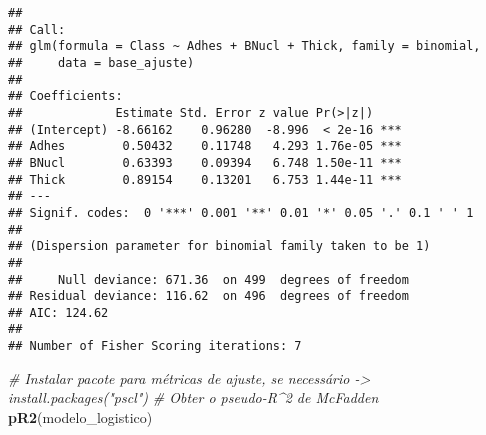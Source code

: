 \documentclass[
]{article}
\newenvironment{Shaded}{\begin{snugshade}}{\end{snugshade}}
\newcommand{\AttributeTok}[1]{\textcolor[rgb]{0.13,0.29,0.53}{#1}}
\newcommand{\CommentTok}[1]{\textcolor[rgb]{0.56,0.35,0.01}{\textit{#1}}}
\newcommand{\DecValTok}[1]{\textcolor[rgb]{0.00,0.00,0.81}{#1}}
\newcommand{\FunctionTok}[1]{\textcolor[rgb]{0.13,0.29,0.53}{\textbf{#1}}}
\newcommand{\NormalTok}[1]{#1}
\newcommand{\OtherTok}[1]{\textcolor[rgb]{0.56,0.35,0.01}{#1}}
\newcommand{\SpecialCharTok}[1]{\textcolor[rgb]{0.81,0.36,0.00}{\textbf{#1}}}
\newcommand{\StringTok}[1]{\textcolor[rgb]{0.31,0.60,0.02}{#1}}
\begin{document}
\begin{Shaded}
\end{Shaded}

\begin{verbatim}
## 
## Call:
## glm(formula = Class ~ Adhes + BNucl + Thick, family = binomial, 
##     data = base_ajuste)
## 
## Coefficients:
##             Estimate Std. Error z value Pr(>|z|)    
## (Intercept) -8.66162    0.96280  -8.996  < 2e-16 ***
## Adhes        0.50432    0.11748   4.293 1.76e-05 ***
## BNucl        0.63393    0.09394   6.748 1.50e-11 ***
## Thick        0.89154    0.13201   6.753 1.44e-11 ***
## ---
## Signif. codes:  0 '***' 0.001 '**' 0.01 '*' 0.05 '.' 0.1 ' ' 1
## 
## (Dispersion parameter for binomial family taken to be 1)
## 
##     Null deviance: 671.36  on 499  degrees of freedom
## Residual deviance: 116.62  on 496  degrees of freedom
## AIC: 124.62
## 
## Number of Fisher Scoring iterations: 7
\end{verbatim}

\begin{Shaded}
\begin{Highlighting}[]
\CommentTok{\# Instalar pacote para métricas de ajuste, se necessário {-}\textgreater{} install.packages("pscl")}
\CommentTok{\# Obter o pseudo{-}R\^{}2 de McFadden}
\FunctionTok{pR2}\NormalTok{(modelo\_logistico)}
\end{Highlighting}
\end{Shaded}
\end{document}
